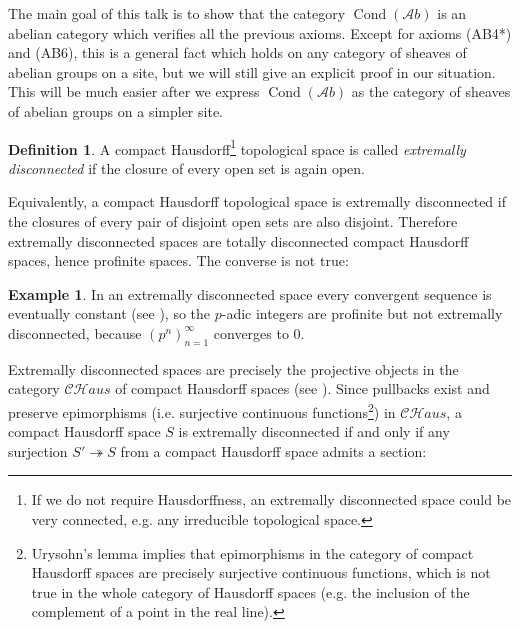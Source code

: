 \documentclass[11pt,A4]{article}
\theoremstyle{plain}
\theoremstyle{definition}
\newtheorem{defn}[thm]{Definition}
\newtheorem{exa}[thm]{Example}
\theoremstyle{remark}
\newcommand{\CHaus}{\mathscr{CH}aus}
\newcommand{\Ab}{\mathscr{A}b}
\DeclareMathOperator{\Cond}{Cond}
\begin{document}
The main goal of this talk is to show that the category $\Cond(\Ab)$ is an abelian category which verifies all the previous axioms.
Except for axioms (AB4*) and (AB6), this is a general fact which holds on any category of sheaves of abelian groups on a site, but we will still give an explicit proof in our situation.
This will be much easier after we express $\Cond(\Ab)$ as the category of sheaves of abelian groups on a simpler site.

\begin{defn}
    A compact Hausdorff\footnote{If we do not require Hausdorffness, an extremally disconnected space could be very connected, e.g. any irreducible topological space.} topological space is called \textit{extremally disconnected} if the closure of every open set is again open.
\end{defn}

Equivalently, a compact Hausdorff topological space is extremally disconnected if the closures of every pair of disjoint open sets are also disjoint.
Therefore extremally disconnected spaces are totally disconnected compact Hausdorff spaces, hence profinite spaces.
The converse is not true:

\begin{exa}
    In an extremally disconnected space every convergent sequence is eventually constant (see \cite[Theorem 1.3]{gle58}), so the $p$-adic integers are profinite but not extremally disconnected, because $(p^{n})_{n=1}^{\infty}$ converges to $0$.
\end{exa}
    
Extremally disconnected spaces are precisely the projective objects in the category $\CHaus$ of compact Hausdorff spaces (see \cite[Theorem 2.5]{gle58}).
Since pullbacks exist and preserve epimorphisms (i.e. surjective continuous functions\footnote{Urysohn's lemma implies that epimorphisms in the category of compact Hausdorff spaces are precisely surjective continuous functions, which is not true in the whole category of Hausdorff spaces (e.g. the inclusion of the complement of a point in the real line).}) in $\CHaus$, a compact Hausdorff space $S$ is extremally disconnected if and only if any surjection $S'\twoheadrightarrow S$ from a compact Hausdorff space admits a section:
\begin{center}
\end{center}
\end{document}
